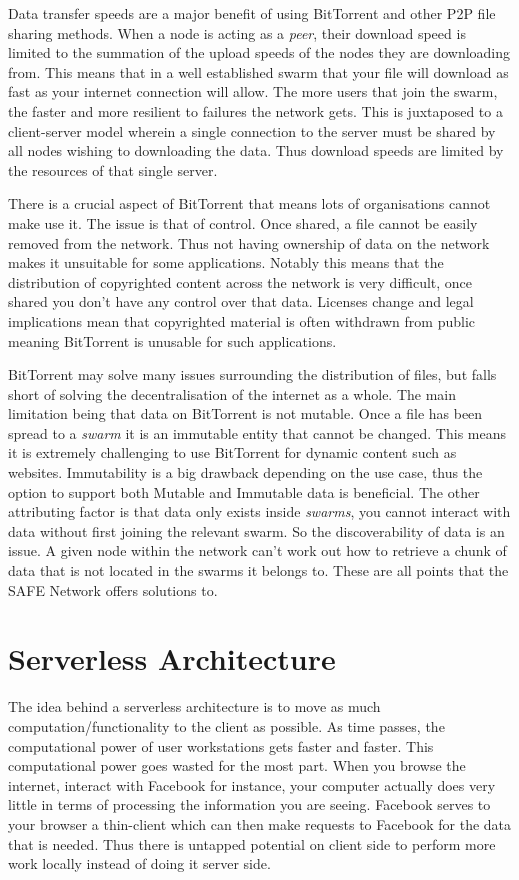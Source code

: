 Data transfer speeds are a major benefit of using BitTorrent and other P2P file sharing methods. When a node is acting as a \textit{peer}, their download speed is limited to the summation of the upload speeds of the nodes they are downloading from. This means that in a well established swarm that your file will download as fast as your internet connection will allow. The more users that join the swarm, the faster and more resilient to failures the network gets. This is juxtaposed to a client-server model wherein a single connection to the server must be shared by all nodes wishing to downloading the data. Thus download speeds are limited by the resources of that single server.

There is a crucial aspect of BitTorrent that means lots of organisations cannot make use it. The issue is that of control. Once shared, a file cannot be easily removed from the network. Thus not having ownership of data on the network makes it unsuitable for some applications. Notably this means that the distribution of copyrighted content across the network is very difficult, once shared you don't have any control over that data. Licenses change and legal implications mean that copyrighted material is often withdrawn from public meaning BitTorrent is unusable for such applications.

BitTorrent may solve many issues surrounding the distribution of files, but falls short of solving the decentralisation of the internet as a whole. The main limitation being that data on BitTorrent is not mutable. Once a file has been spread to a \textit{swarm} it is an immutable entity that cannot be changed. This means it is extremely challenging to use BitTorrent for dynamic content such as websites. Immutability is a big drawback depending on the use case, thus the option to support both Mutable and Immutable data is beneficial. The other attributing factor is that data only exists inside \textit{swarms}, you cannot interact with data without first joining the relevant swarm. So the discoverability of data is an issue. A given node within the network can't work out how to retrieve a chunk of data that is not located in the swarms it belongs to. These are all points that the SAFE Network offers solutions to.

\section{Serverless Architecture}

The idea behind a serverless architecture is to move as much computation/functionality to the client as possible. As time passes, the computational power of user workstations gets faster and faster. This computational power goes wasted for the most part. When you browse the internet, interact with Facebook for instance, your computer actually does very little in terms of processing the information you are seeing. Facebook serves to your browser a thin-client which can then make requests to Facebook for the data that is needed. Thus there is untapped potential on client side to perform more work locally instead of doing it server side. 

